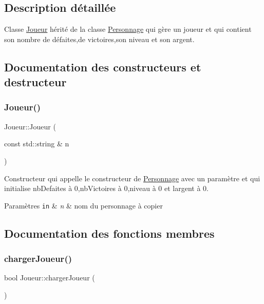 \subsection{Description détaillée}
Classe \hyperlink{class_joueur}{Joueur} hérité de la classe \hyperlink{class_personnage}{Personnage} qui gère un joueur et qui contient son nombre de défaites,de victoires,son niveau et son argent. 

\subsection{Documentation des constructeurs et destructeur}
\mbox{\label{class_joueur_a38f10c26b532efd5b461a1cca84f4cdd}} 
\subsubsection{\texorpdfstring{Joueur()}{Joueur()}}
{\footnotesize\ttfamily Joueur\+::\+Joueur (\begin{DoxyParamCaption}\item[{const std\+::string \&}]{n }\end{DoxyParamCaption})}



Constructeur qui appelle le constructeur de \hyperlink{class_personnage}{Personnage} avec un paramètre et qui initialise nb\+Defaites à 0,nb\+Victoires à 0,niveau à 0 et l\textquotesingle{}argent à 0. 


\begin{DoxyParams}[1]{Paramètres}
\mbox{\tt in}  & {\em n} & nom du personnage à copier \\
\hline
\end{DoxyParams}


\subsection{Documentation des fonctions membres}
\mbox{\label{class_joueur_a2bf2a581a2e4de27a812e21b360ab9f3}} 
\subsubsection{\texorpdfstring{charger\+Joueur()}{chargerJoueur()}}
{\footnotesize\ttfamily bool Joueur\+::charger\+Joueur (\begin{DoxyParamCaption}{ }\end{DoxyParamCaption})}



